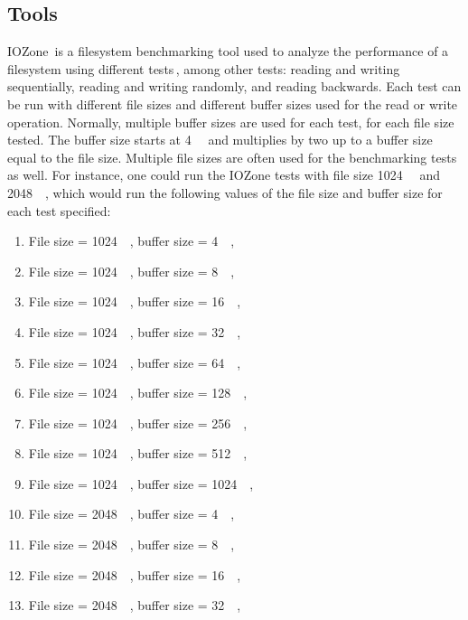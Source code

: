 \begin{enumerate}
\subsection{Tools}
IOZone\,\cite{IozoneFilesystemBenchmark} is a filesystem benchmarking tool used to analyze the performance of a filesystem using different tests\,\cite{iozoneIozoneFilesystemBenchmark}, among other tests: reading and writing sequentially, reading and writing randomly, and reading backwards. Each test can be run with different file sizes and different buffer sizes used for the read or write operation. Normally, multiple buffer sizes are used for each test, for each file size tested. The buffer size starts at \SI{4}{\kilo\byte} and multiplies by two up to a buffer size equal to the file size. Multiple file sizes are often used for the benchmarking tests as well. For instance, one could run the IOZone tests with file size \SI{1024}{\kilo\byte} and \SI{2048}{\kilo\byte}, which would run the following values of the file size and buffer size for each test specified:
\begin{enumerate}
	\item File size = \SI{1024}{\kilo\byte}, buffer size = \SI{4}{\kilo\byte},
	\item File size = \SI{1024}{\kilo\byte}, buffer size = \SI{8}{\kilo\byte},
	\item File size = \SI{1024}{\kilo\byte}, buffer size = \SI{16}{\kilo\byte},
	\item File size = \SI{1024}{\kilo\byte}, buffer size = \SI{32}{\kilo\byte},
	\item File size = \SI{1024}{\kilo\byte}, buffer size = \SI{64}{\kilo\byte},
	\item File size = \SI{1024}{\kilo\byte}, buffer size = \SI{128}{\kilo\byte},
	\item File size = \SI{1024}{\kilo\byte}, buffer size = \SI{256}{\kilo\byte},
	\item File size = \SI{1024}{\kilo\byte}, buffer size = \SI{512}{\kilo\byte},
	\item File size = \SI{1024}{\kilo\byte}, buffer size = \SI{1024}{\kilo\byte},
	\item File size = \SI{2048}{\kilo\byte}, buffer size = \SI{4}{\kilo\byte},
	\item File size = \SI{2048}{\kilo\byte}, buffer size = \SI{8}{\kilo\byte},
	\item File size = \SI{2048}{\kilo\byte}, buffer size = \SI{16}{\kilo\byte},
	\item File size = \SI{2048}{\kilo\byte}, buffer size = \SI{32}{\kilo\byte},

\end{enumerate}
\end{enumerate}
